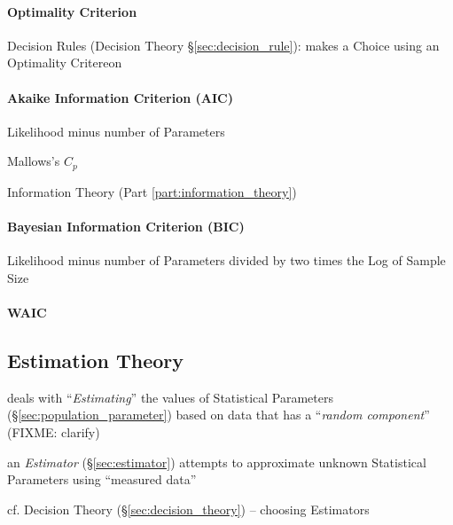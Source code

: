 \paragraph{Optimality Criterion}\label{sec:optimality_criterion}\hfill

\fist Decision Rules (Decision Theory \S\ref{sec:decision_rule}): makes a
Choice using an Optimality Critereon



\paragraph{Akaike Information Criterion (AIC)}\label{sec:aic}\hfill

Likelihood minus number of Parameters

Mallows's $C_p$

\fist Information Theory (Part \ref{part:information_theory})



\paragraph{Bayesian Information Criterion (BIC)}\label{sec:bic}\hfill

Likelihood minus number of Parameters divided by two times the Log of Sample
Size



\paragraph{WAIC}\label{sec:waic}\hfill



\subsection{Estimation Theory}\label{sec:estimation_theory}

deals with ``\emph{Estimating}'' the values of Statistical Parameters
(\S\ref{sec:population_parameter}) based on data that has a ``\emph{random
  component}'' (FIXME: clarify)

an \emph{Estimator} (\S\ref{sec:estimator}) attempts to approximate unknown
Statistical Parameters using ``measured data''

\fist cf. Decision Theory (\S\ref{sec:decision_theory}) -- choosing Estimators

